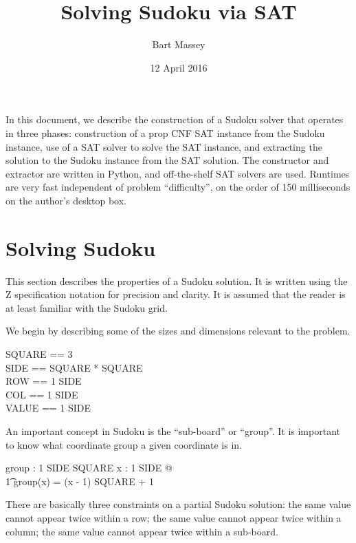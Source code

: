 \documentclass{article}
\title{Solving Sudoku via SAT}
\author{Bart Massey}
\date{12 April 2016}
\begin{document}
\maketitle

In this document, we describe the construction of a Sudoku
solver that operates in three phases: construction of a prop
CNF SAT instance from the Sudoku instance, use of a SAT solver
to solve the SAT instance, and extracting the solution to the
Sudoku instance from the SAT solution. The constructor and
extractor are written in Python, and off-the-shelf SAT
solvers are used. Runtimes are very fast independent of
problem ``difficulty'', on the order of 150 milliseconds on
the author's desktop box.

\section{Solving Sudoku}

This section describes the properties of a Sudoku solution.
It is written using the Z specification notation for
precision and clarity.  It is assumed that the reader is at
least familiar with the Sudoku grid.

We begin by describing some of the sizes and dimensions
relevant to the problem.

\begin{zed}
  SQUARE == 3 \\
  SIDE == SQUARE * SQUARE \\
  ROW == 1 \upto SIDE \\
  COL == 1 \upto SIDE \\
  VALUE == 1 \upto SIDE
\end{zed}

An important concept in Sudoku is the ``sub-board'' or
``group''.  It is important to know what coordinate group a
given coordinate is in.

\begin{axdef}
  group : 1 \upto SIDE  \upto SQUARE
\where
  \forall x : 1 \upto SIDE @ \\
  \t1 group(x) = (x - 1) \div SQUARE + 1
\end{axdef}

There are basically three constraints on a partial Sudoku
solution: the same value cannot appear twice within a row;
the same value cannot appear twice within a column; the same
value cannot appear twice within a sub-board.
\end{document}
